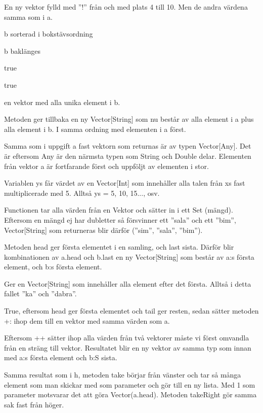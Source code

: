 \Subtask  En ny vektor fylld med ''!'' från och med plats 4 till 10. Men de andra värdena samma som i a.

\Subtask  b sorterad i bokstävsordning

\Subtask  b baklänges

\Subtask  true

\Subtask  true

\Subtask  en vektor med alla unika element i b.

\Task %

\Subtask
Metoden ger tillbaka en ny Vector[String] som nu består av alla element i a plus alla element i b. I samma ordning med elementen i a först.

\Subtask
Samma som i uppgift a fast vektorn som returnas är av typen Vector[Any]. Det är eftersom Any är den närmsta typen som String och Double delar. Elementen från vektor a är fortfarande först och uppföljt av elementen i stor.

\Subtask
Variablen ys får värdet av en Vector[Int] som innehåller alla talen från xs fast multiplicerade med 5. Alltså ys = 5, 10, 15..., osv.

\Subtask
Functionen tar alla värden från en Vektor och sätter in i ett Set (mängd). Eftersom en mängd ej har dubletter så försvinner ett ''sala'' och ett ''bim'', Vector[String] som returneras blir därför (''sim'', ''sala'', ''bim'').

\Subtask
Metoden head ger första elementet i en samling, och last sista. Därför blir kombinationen av a.head och b.last en ny Vector[String] som består av a:s första element, och b:s första element.

\Subtask
Ger en Vector[String] som innehåller alla element efter det första. Alltså i detta fallet ''ka'' och ''dabra''.

\Subtask
True, eftersom head ger första elementet och tail ger resten, sedan sätter metoden +: ihop dem till en vektor med samma värden som a.

\Subtask
Eftersom ++ sätter ihop alla värden från två vektorer måste vi först omvandla från en sträng till vektor. Resultatet blir en ny vektor av samma typ som innan med a:s första element och b:S sista.

\Subtask
Samma resultat som i h, metoden take börjar från vänster och tar så många element som man skickar med som parameter och gör till en ny lista. Med 1 som parameter motsvarar det att göra Vector(a.head). Metoden takeRight gör samma sak fast från höger.

